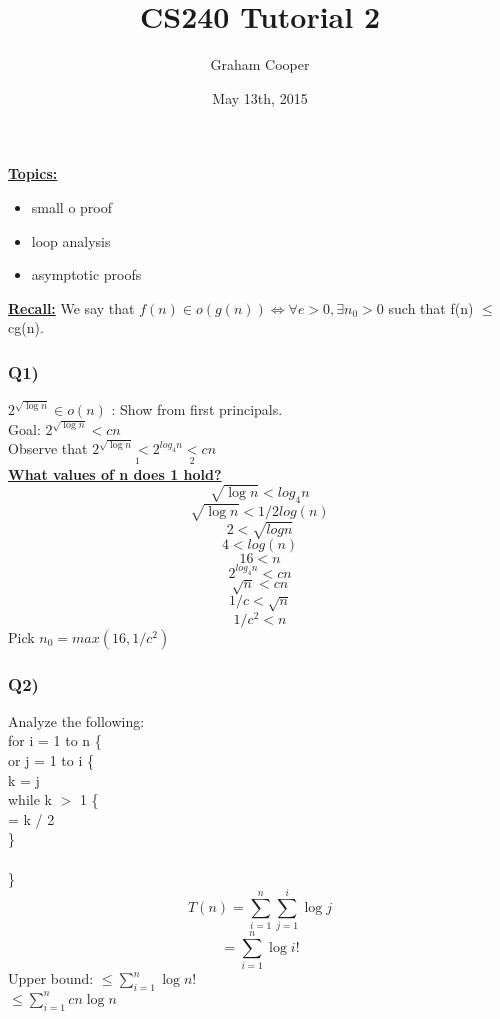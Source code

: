 \documentclass[12pt]{article}
\title{\vspace{-15ex}CS240 Tutorial 2\vspace{-1ex}}
\date{May 13th, 2015}
\author{Graham Cooper}
\newcommand{\myt}[1]{\textbf{\underline{#1}}}
\newcommand{\tab}[1]{\hspace{.2\textwidth}\rlap{#1}}
\begin{document}
	\maketitle
	\myt{Topics:}
	\begin{itemize}
		\item small o proof
		\item loop analysis
		\item asymptotic proofs
	\end{itemize}
	
	\myt{Recall:} We say that $f(n) \in o(g(n)) \iff \forall e > 0, \exists n_0 > 0$ such that f(n) $\leq$ cg(n).\\
	
	\subsubsection*{Q1)}
	$2^{\sqrt{\log n}} \in o(n)$ : Show from first principals.\\
	Goal: $2^{\sqrt{\log n}} < cn$\\
	
	Observe that $\underset{1}{2^{\sqrt{\log n}} < 2^{log_4{n}}} \underset{2}{<} cn$\\
	\myt{What values of n does 1 hold?}\\
	$$\sqrt{\log{n}} < log_4{n}$$
	$$\sqrt{\log{n}} < 1/2log(n)$$
	$$2 < \sqrt{logn}$$
	$$4 < log(n)$$
	$$16 < n$$
	$$2^{log_4{n}} < cn$$
	$$\sqrt{n} < cn$$
	$$1/c < \sqrt{n}$$
	$$1/c^2 < n$$
	Pick $n_0 = max(16, 1/c^2)$
	
	\subsubsection*{Q2)}
	Analyze the following:\\
	for i = 1 to n \{\\
	\tab for j = 1 to i \{\\
	\tab \tab k = j\\
	\tab \tab 	while k $>$ 1 \{\\
	\tab \tab \tab k = k / 2\\
	\tab \tab\}\\
	\tab \}	\\
	\}\\
	
	$$T(n) = \sum_{i = 1}^{n}\sum_{j=1}^{i}\log{j}$$
	$$ = \sum_{i = 1}^{n}\log{i!}$$
	Upper bound: 
	$\leq \sum_{i = 1}^{n}\log{n!}$\\
	$\leq \sum_{i = 1}^{n}cn\log{n}$\\
	
\end{document}
